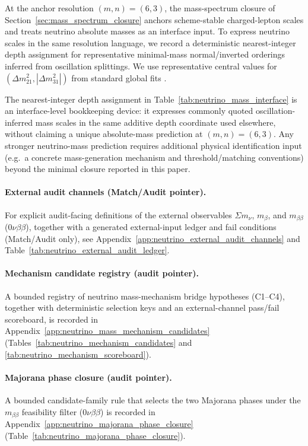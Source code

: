 At the anchor resolution $(m,n)=(6,3)$, the mass-spectrum closure of Section~\ref{sec:mass_spectrum_closure} anchors scheme-stable charged-lepton scales and treats neutrino absolute masses as an interface input.
To express neutrino scales in the same resolution language, we record a deterministic nearest-integer depth assignment for representative minimal-mass normal/inverted orderings inferred from oscillation splittings.
We use representative central values for $(\Delta m_{21}^2,|\Delta m_{31}^2|)$ from standard global fits \cite{PDGRPP2024,Esteban2020NuFIT}.
\begin{remark}\label{rem:neutrino_scale_status}
The nearest-integer depth assignment in Table~\ref{tab:neutrino_mass_interface} is an interface-level bookkeeping device: it expresses commonly quoted oscillation-inferred mass scales in the same additive depth coordinate used elsewhere, without claiming a unique absolute-mass prediction at $(m,n)=(6,3)$.
Any stronger neutrino-mass prediction requires additional physical identification input (e.g.\ a concrete mass-generation mechanism and threshold/matching conventions) beyond the minimal closure reported in this paper.
\end{remark}

\paragraph{External audit channels (Match/Audit pointer).}
\MatchTag For explicit audit-facing definitions of the external observables
$\Sigma m_\nu$, $m_\beta$, and $m_{\beta\beta}$ (0$\nu\beta\beta$),
together with a generated external-input ledger and fail conditions (Match/Audit only),
see Appendix~\ref{app:neutrino_external_audit_channels} and Table~\ref{tab:neutrino_external_audit_ledger}.

\paragraph{Mechanism candidate registry (audit pointer).}
\AuditTag A bounded registry of neutrino mass-mechanism bridge hypotheses (C1--C4), together with deterministic selection keys and an external-channel pass/fail scoreboard, is recorded in Appendix~\ref{app:neutrino_mass_mechanism_candidates} (Tables~\ref{tab:neutrino_mechanism_candidates} and \ref{tab:neutrino_mechanism_scoreboard}).

\paragraph{Majorana phase closure (audit pointer).}
\AuditTag A bounded candidate-family rule that selects the two Majorana phases under the $m_{\beta\beta}$ feasibility filter (0$\nu\beta\beta$) is recorded in Appendix~\ref{app:neutrino_majorana_phase_closure} (Table~\ref{tab:neutrino_majorana_phase_closure}).

